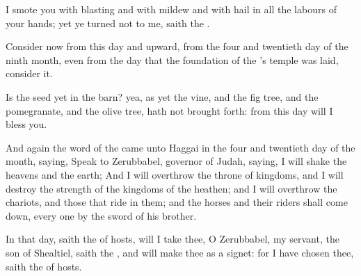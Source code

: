 \Verse I smote you with blasting and with mildew and with hail in all the labours of your hands; yet ye turned not to me, saith the \LORD.

\Verse Consider now from this day and upward, from the four and twentieth day of the ninth month, even from the day that the foundation of the \LORD's temple was laid, consider it.

\Verse Is the seed yet in the barn? yea, as yet the vine, and the fig tree, and the pomegranate, and the olive tree, hath not brought forth: from this day will I bless you.

\Verse And again the word of the \LORD came unto Haggai in the four and twentieth day of the month, saying, \Verse Speak to Zerubbabel, governor of Judah, saying, I will shake the heavens and the earth; \Verse And I will overthrow the throne of kingdoms, and I will destroy the strength of the kingdoms of the heathen; and I will overthrow the chariots, and those that ride in them; and the horses and their riders shall come down, every one by the sword of his brother.

\Verse In that day, saith the \LORD of hosts, will I take thee, O Zerubbabel, my servant, the son of Shealtiel, saith the \LORD, and will make thee as a signet: for I have chosen thee, saith the \LORD of hosts.


